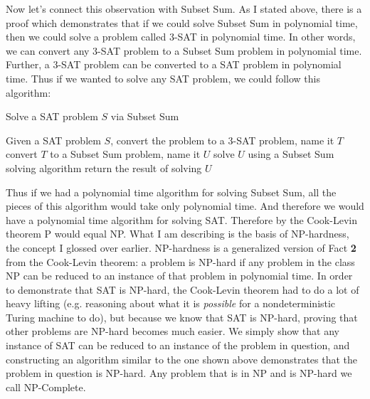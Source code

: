 \documentclass[12pt,twoside]{reedthesis}
\begin{document}
Now let's connect this observation with Subset Sum. As I stated above, there is a proof which demonstrates that if we could solve Subset Sum in polynomial time, then we could solve a problem called 3-SAT in polynomial time. In other words, we can convert any 3-SAT problem to a Subset Sum problem in polynomial time. Further, a 3-SAT problem can be converted to a SAT problem in polynomial time. Thus if we wanted to solve any SAT problem, we could follow this algorithm:

\begin{algorithm}
\caption{Solve a SAT problem $S$ via Subset Sum}
\begin{algorithmic}
\State Given a SAT problem $S$, convert the problem to a 3-SAT problem, name it $T$
\State convert $T$ to a Subset Sum problem, name it $U$
\State solve $U$ using a Subset Sum solving algorithm
\State return the result of solving $U$
\end{algorithmic}
\end{algorithm}

Thus if we had a polynomial time algorithm for solving Subset Sum, all the pieces of this algorithm would take only polynomial time. And therefore we would have a polynomial time algorithm for solving SAT. Therefore by the Cook-Levin theorem P would equal NP. What I am describing is the basis of NP-hardness, the concept I glossed over earlier. NP-hardness is a generalized version of Fact \textbf{2} from the Cook-Levin theorem: a problem is NP-hard if any problem in the class NP can be reduced to an instance of that problem in polynomial time. In order to demonstrate that SAT is NP-hard, the Cook-Levin theorem had to do a lot of heavy lifting (e.g. reasoning about what it is \textit{possible} for a nondeterministic Turing machine to do), but because we know that SAT is NP-hard, proving that other problems are NP-hard becomes much easier. We simply show that any instance of SAT can be reduced to an instance of the problem in question, and constructing an algorithm similar to the one shown above demonstrates that the problem in question is NP-hard. Any problem that is in NP and is NP-hard we call NP-Complete. \par
\end{document}
